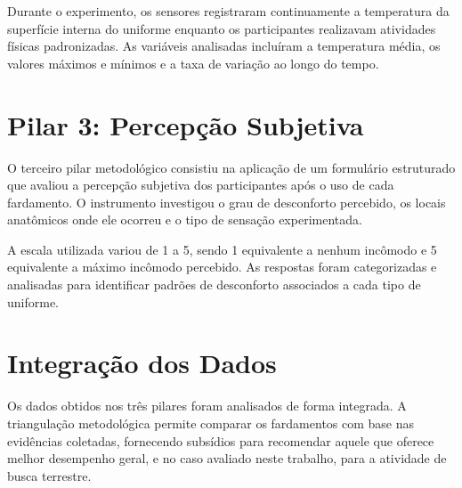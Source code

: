 Durante o experimento, os sensores registraram continuamente a temperatura da superfície 
interna do uniforme enquanto os participantes realizavam atividades físicas padronizadas. As variáveis 
analisadas incluíram a temperatura média, os valores máximos e mínimos e a taxa de variação ao longo 
do tempo.

\section{Pilar 3: Percepção Subjetiva}

O terceiro pilar metodológico consistiu na aplicação de um formulário estruturado que avaliou a 
percepção subjetiva dos participantes após o uso de cada fardamento. O instrumento investigou o grau 
de desconforto percebido, os locais anatômicos onde ele ocorreu e o tipo de sensação experimentada.

A escala utilizada variou de 1 a 5, sendo 1 equivalente a nenhum incômodo e 5 equivalente a máximo 
incômodo percebido. As respostas foram categorizadas e analisadas para identificar padrões de 
desconforto associados a cada tipo de uniforme.

\section{Integração dos Dados}

Os dados obtidos nos três pilares foram analisados de forma integrada. A triangulação metodológica 
permite comparar os fardamentos com base nas evidências coletadas, fornecendo subsídios 
para recomendar aquele que oferece melhor desempenho geral, e no caso avaliado neste trabalho, 
para a atividade de busca terrestre.
